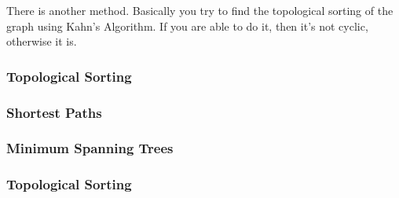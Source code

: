 \documentclass[11pt]{article}
\begin{document}
There is another method. Basically you try to find the topological sorting of the graph using Kahn's Algorithm. If you are able to do it, then it's not cyclic, otherwise it is.

\subsubsection{Topological Sorting}
\subsubsection{Shortest Paths}
\subsubsection{Minimum Spanning Trees}
\subsubsection{Topological Sorting}
\end{document}
